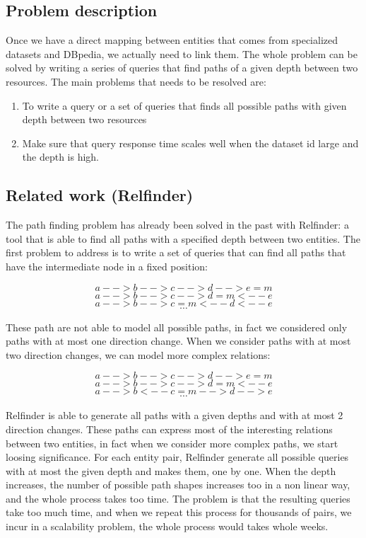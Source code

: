 \documentclass[paper=a4, fontsize=11pt]{scrartcl}
\begin{document}
\subsection{Problem description}
Once we have a direct mapping between entities that comes from specialized datasets and DBpedia, we actually need to link them.
The whole problem can be solved by writing a series of queries that find paths of a given depth between two resources. 
The main problems that needs to be resolved are:
\begin{enumerate}
\item To write a query or a set of queries that finds all possible paths with given depth between two resources
\item Make sure that query response time scales well when the dataset id large and the depth is high.
\end{enumerate}

\subsection{Related work (Relfinder)}
The path finding problem has already been solved in the past with Relfinder: a tool that is able to find all paths with a specified depth between two entities. 
The first problem to address is to write a set of queries that can find all paths that have the intermediate node in a fixed position:

$$a-->b-->c-->d-->e=m$$
$$a-->b-->c-->d=m<--e$$
$$a-->b-->c=m<--d<--e$$
$$\cdots$$

These path are not able to model all possible paths, in fact we considered only paths with at most one direction change.
When we consider paths with at most two direction changes, we can model more complex relations:

$$a-->b-->c-->d-->e=m$$
$$a-->b-->c-->d=m<--e$$
$$a-->b<--c=m-->d-->e$$
$$\cdots$$

Relfinder is able to generate all paths with a given depths and with at most 2 direction changes.
These paths can express most of the interesting relations between two entities, in fact when we consider more complex paths, we start loosing significance.
For each entity pair, Relfinder generate all possible queries with at most the given depth and makes them, one by one.
When the depth increases, the number of possible path shapes increases too in a non linear way, and the whole process takes too time. The problem is that the resulting queries take too much time, and when we repeat this process for thousands of pairs, we incur in a scalability problem, the whole process would takes whole weeks.
\end{document}
